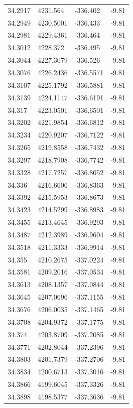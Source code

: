 \begin{table}[H]
\begin{tabular}{llll}
34.2917 & 4231.564 & -336.402 & -9.81 \\
34.2949 & 4230.5001 & -336.433 & -9.81 \\
34.2981 & 4229.4361 & -336.464 & -9.81 \\
34.3012 & 4228.372 & -336.495 & -9.81 \\
34.3044 & 4227.3079 & -336.526 & -9.81 \\
34.3076 & 4226.2436 & -336.5571 & -9.81 \\
34.3107 & 4225.1792 & -336.5881 & -9.81 \\
34.3139 & 4224.1147 & -336.6191 & -9.81 \\
34.317 & 4223.0501 & -336.6501 & -9.81 \\
34.3202 & 4221.9854 & -336.6812 & -9.81 \\
34.3234 & 4220.9207 & -336.7122 & -9.81 \\
34.3265 & 4219.8558 & -336.7432 & -9.81 \\
34.3297 & 4218.7908 & -336.7742 & -9.81 \\
34.3328 & 4217.7257 & -336.8052 & -9.81 \\
34.336 & 4216.6606 & -336.8363 & -9.81 \\
34.3392 & 4215.5953 & -336.8673 & -9.81 \\
34.3423 & 4214.5299 & -336.8983 & -9.81 \\
34.3455 & 4213.4645 & -336.9293 & -9.81 \\
34.3487 & 4212.3989 & -336.9604 & -9.81 \\
34.3518 & 4211.3333 & -336.9914 & -9.81 \\
34.355 & 4210.2675 & -337.0224 & -9.81 \\
34.3581 & 4209.2016 & -337.0534 & -9.81 \\
34.3613 & 4208.1357 & -337.0844 & -9.81 \\
34.3645 & 4207.0696 & -337.1155 & -9.81 \\
34.3676 & 4206.0035 & -337.1465 & -9.81 \\
34.3708 & 4204.9372 & -337.1775 & -9.81 \\
34.374 & 4203.8709 & -337.2085 & -9.81 \\
34.3771 & 4202.8044 & -337.2396 & -9.81 \\
34.3803 & 4201.7379 & -337.2706 & -9.81 \\
34.3834 & 4200.6713 & -337.3016 & -9.81 \\
34.3866 & 4199.6045 & -337.3326 & -9.81 \\
34.3898 & 4198.5377 & -337.3636 & -9.81 \\

\end{tabular}
\end{table}
